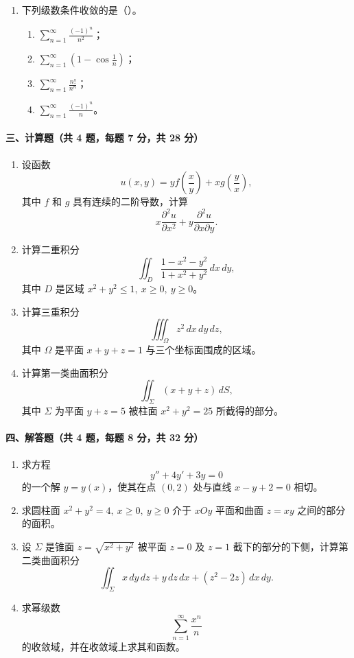 \begin{enumerate}
  \item 下列级数条件收敛的是（\quad）。
  \begin{enumerate}
    \item[A.] $\displaystyle \sum_{n=1}^{\infty}\frac{(-1)^n}{n^2}$；
    \item[B.] $\displaystyle \sum_{n=1}^{\infty}\left(1-\cos\frac1n\right)$；
    \item[C.] $\displaystyle \sum_{n=1}^{\infty}\frac{n!}{n^n}$；
    \item[D.] $\displaystyle \sum_{n=1}^{\infty}\frac{(-1)^n}{n}$。
  \end{enumerate}
\end{enumerate}

\paragraph*{三、计算题（共 4 题，每题 7 分，共 28 分）}
\begin{enumerate}
  \item 设函数
  \[
    u(x,y)=y f\left(\frac{x}{y}\right)+x g\left(\frac{y}{x}\right),
  \]
  其中 $f$ 和 $g$ 具有连续的二阶导数，计算
  \[
    x\frac{\partial^2u}{\partial x^2}+y\frac{\partial^2u}{\partial x\partial y}.
  \]

  \item 计算二重积分
  \[
    \iint_D \frac{1-x^2-y^2}{1+x^2+y^2}\,dx\,dy,
  \]
  其中 $D$ 是区域 $x^2+y^2\le1,\ x\ge0,\ y\ge0$。

  \item 计算三重积分
  \[
    \iiint_\Omega z^2\,dx\,dy\,dz,
  \]
  其中 $\Omega$ 是平面 $x+y+z=1$ 与三个坐标面围成的区域。

  \item 计算第一类曲面积分
  \[
    \iint_\Sigma (x+y+z)\,dS,
  \]
  其中 $\Sigma$ 为平面 $y+z=5$ 被柱面 $x^2+y^2=25$ 所截得的部分。
\end{enumerate}

\paragraph*{四、解答题（共 4 题，每题 8 分，共 32 分）}
\begin{enumerate}
  \item 求方程
  \[
    y''+4y'+3y=0
  \]
  的一个解 $y=y(x)$，使其在点 $(0,2)$ 处与直线 $x-y+2=0$ 相切。

  \item 求圆柱面 $x^2+y^2=4,\ x\ge0,\ y\ge0$ 介于 $xOy$ 平面和曲面 $z=xy$ 之间的部分的面积。

  \item 设 $\Sigma$ 是锥面 $z=\sqrt{x^2+y^2}$ 被平面 $z=0$ 及 $z=1$ 截下的部分的下侧，计算第二类曲面积分
  \[
    \iint_\Sigma x\,dy\,dz+y\,dz\,dx+(z^2-2z)\,dx\,dy.
  \]

  \item 求幂级数
  \[
    \sum_{n=1}^{\infty}\frac{x^n}{n}
  \]
  的收敛域，并在收敛域上求其和函数。
\end{enumerate}

